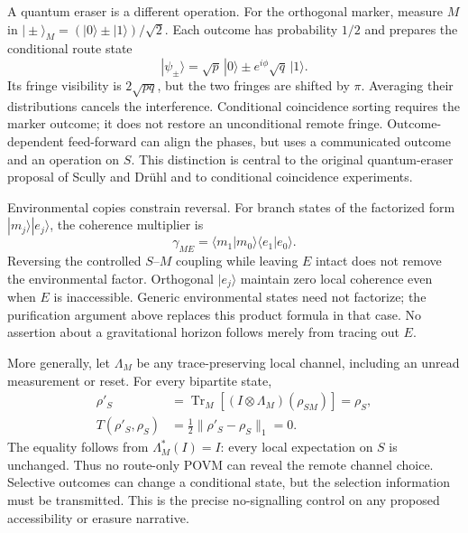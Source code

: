 A quantum eraser is a different operation. For the orthogonal marker, measure $M$ in $|\!\pm\rangle_M=(|0\rangle\pm|1\rangle)/\sqrt2$. Each outcome has probability $1/2$ and prepares the conditional route state
\begin{equation}
 |\psi_\pm\rangle=\sqrt p\,|0\rangle
                   \pm e^{i\phi}\sqrt q\,|1\rangle .
\end{equation}
Its fringe visibility is $2\sqrt{pq}$, but the two fringes are shifted by $\pi$. Averaging their distributions cancels the interference. Conditional coincidence sorting requires the marker outcome; it does not restore an unconditional remote fringe. Outcome-dependent feed-forward can align the phases, but uses a communicated outcome and an operation on $S$. This distinction is central to the original quantum-eraser proposal of Scully and Dr\"uhl and to conditional coincidence experiments.\cite{ScullyDruhl1982,Kim2000}

Environmental copies constrain reversal. For branch states of the factorized form $|m_j\rangle|e_j\rangle$, the coherence multiplier is
\begin{equation}
 \gamma_{ME}=\langle m_1|m_0\rangle
                  \langle e_1|e_0\rangle .
\end{equation}
Reversing the controlled $S$--$M$ coupling while leaving $E$ intact does not remove the environmental factor. Orthogonal $|e_j\rangle$ maintain zero local coherence even when $E$ is inaccessible. Generic environmental states need not factorize; the purification argument above replaces this product formula in that case. No assertion about a gravitational horizon follows merely from tracing out $E$.

More generally, let $\Lambda_M$ be any trace-preserving local channel, including an unread measurement or reset. For every bipartite state,
\begin{align}
 \rho'_S&=\operatorname{Tr}_M[(I\otimes\Lambda_M)(\rho_{SM})]
            =\rho_S,\\
 T(\rho'_S,\rho_S)&=\tfrac12\|\rho'_S-\rho_S\|_1=0.
\end{align}
The equality follows from $\Lambda_M^*(I)=I$: every local expectation on $S$ is unchanged. Thus no route-only POVM can reveal the remote channel choice. Selective outcomes can change a conditional state, but the selection information must be transmitted. This is the precise no-signalling control on any proposed accessibility or erasure narrative.

